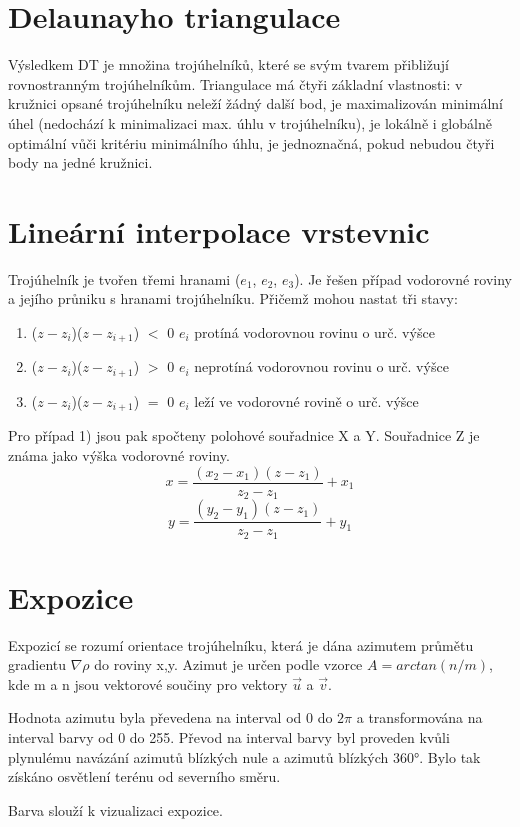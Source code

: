 \documentclass[oneside,12pt,a4paper]{book}
\begin{document}
\section{Delaunayho triangulace}
Výsledkem DT je množina trojúhelníků, které se svým tvarem přibližují rovnostranným trojúhelníkům. Triangulace má čtyři základní vlastnosti: v kružnici opsané trojúhelníku neleží žádný další bod, je maximalizován minimální úhel (nedochází k minimalizaci max. úhlu v trojúhelníku), je lokálně i globálně optimální vůči kritériu minimálního úhlu, je jednoznačná, pokud nebudou čtyři body na jedné kružnici.

\section{Lineární interpolace vrstevnic}
Trojúhelník je tvořen třemi hranami ($e_1$, $e_2$, $e_3$). Je řešen případ vodorovné roviny a jejího průniku s hranami trojúhelníku. Přičemž mohou nastat tři stavy:
\begin{enumerate}
    \item ($z-z_i$)($z-z_{i+1}$) $<$ 0 \longrightarrow $e_i$ protíná vodorovnou rovinu o urč. výšce
    \item ($z-z_i$)($z-z_{i+1}$) $>$ 0 \longrightarrow $e_i$ neprotíná vodorovnou rovinu o urč. výšce
    \item ($z-z_i$)($z-z_{i+1}$) $=$ 0 \longrightarrow $e_i$ leží ve vodorovné rovině o urč. výšce
\end{enumerate}

Pro případ 1) jsou pak spočteny polohové souřadnice X a Y. Souřadnice Z je známa jako výška vodorovné roviny.
\begin{equation}
    x = \frac{(x_2 - x_1)(z-z_1)}{z_2-z_1}+x_1
\end{equation}
\begin{equation}
    y = \frac{(y_2 - y_1)(z-z_1)}{z_2-z_1}+y_1
\end{equation}

\section{Expozice}
Expozicí se rozumí orientace trojúhelníku, která je dána azimutem průmětu gradientu $\nabla \rho$ do roviny x,y. Azimut je určen podle vzorce $A = arctan (n/m)$, kde m a n jsou vektorové součiny pro vektory $\Vec{u}$ a $\Vec{v}$.\par
Hodnota azimutu byla převedena na interval od 0 do $2\pi$ a transformována na interval barvy od 0 do 255. Převod na interval barvy byl proveden kvůli plynulému navázání azimutů blízkých nule a azimutů blízkých 360°. Bylo tak získáno osvětlení terénu od severního směru.\par
Barva slouží k vizualizaci expozice.\par
\end{document}
